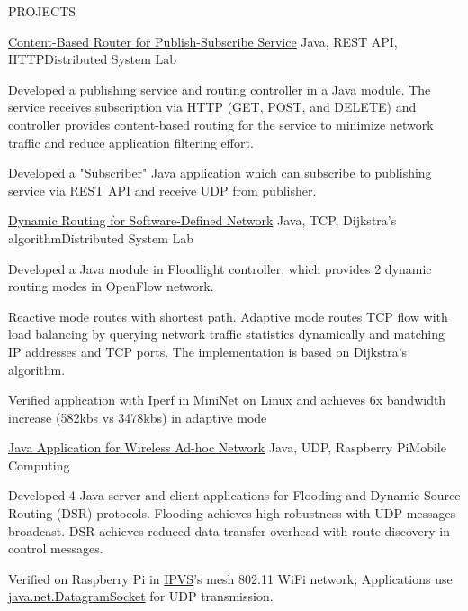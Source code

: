\documentclass{resume} %
\begin{document}
\begin{rSection}{PROJECTS}
\begin{rSubsection}{\href{https://github.com/kuangyu0801/software-defined-networking-ws20/tree/main/sdn-assign-04}{Content-Based Router for Publish-Subscribe Service}} { Java, REST API, HTTP}{Distributed System Lab}{}
\item Developed a publishing service and routing controller in a Java module.  The service receives subscription via HTTP (GET, POST, and
DELETE) and controller provides content-based routing for the service to minimize network traffic and reduce application filtering effort.
\item Developed a "Subscriber" Java application which can subscribe to publishing service via REST API and receive UDP  from publisher.

\end{rSubsection}

\begin{rSubsection}{\href{https://github.com/kuangyu0801/software-defined-networking-ws20/tree/main/sdn-assign-03}{Dynamic Routing for Software-Defined Network}} {Java, TCP, Dijkstra's algorithm}{Distributed System Lab}{}
\item Developed a Java module in Floodlight controller, which provides 2 dynamic routing modes in OpenFlow network. 
\item Reactive mode routes with shortest path. Adaptive mode routes TCP flow with load balancing by querying network traffic statistics dynamically and matching IP addresses and TCP ports. The implementation is based on Dijkstra's algorithm.
\item Verified application with Iperf in MiniNet on Linux and achieves 6x bandwidth increase (582kbs vs 3478kbs) in adaptive mode
\end{rSubsection}

\begin{rSubsection}{\href{https://github.com/kuangyu0801/MobileComputing_SS20_assign04}{Java Application for Wireless Ad-hoc Network}} {Java, UDP, Raspberry Pi}{Mobile Computing}{}
\item Developed 4 Java server and client applications for Flooding and Dynamic Source Routing (DSR) protocols. Flooding achieves high robustness with UDP messages broadcast. DSR achieves reduced data transfer overhead with route discovery in control messages. 
\item Verified on Raspberry Pi in \href {https://www.ipvs.uni-stuttgart.de/}{IPVS}'s mesh 802.11 WiFi network; Applications use \href {https://docs.oracle.com/javase/7/docs/api/java/net/DatagramSocket.html}{java.net.DatagramSocket} for UDP transmission.


\end{rSubsection}
\end{rSection}
\end{document}
